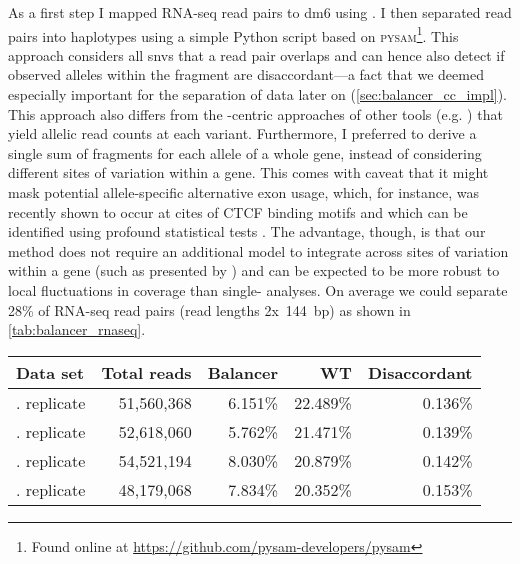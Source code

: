 As a first step I mapped RNA-seq read pairs to \ac{dm6} using \STAR. I then
separated read pairs into haplotypes using a simple Python script based on
\textsc{pysam}\footnote{Found online at \url{https://github.com/pysam-developers/pysam}}.
This approach considers all \acp{snv} that a read pair overlaps and can hence
also detect if observed alleles within the fragment are disaccordant---a fact
that we deemed especially important for the separation of \hic
data later on (\cref{sec:balancer_cc_impl}). This approach also differs
from the \snv-centric approaches of other tools (e.g. \cite{Castel2015}) that
yield allelic read counts at each variant. Furthermore, I preferred to derive a
single sum of fragments for each allele of a whole gene, instead of considering
different sites of variation within a gene. This comes with caveat that
it might mask potential allele-specific alternative exon usage, which, for instance, was
recently shown to occur at cites of CTCF binding motifs
\citep{Ruiz-Velasco2017} and which can be identified using profound
statistical tests \citep[for instance]{Skelly2011}. The advantage, though, is
that our method does not require an additional model to integrate across sites of
variation within a gene (such as presented by \cite{Mayba2014}) and can be
expected to be more robust to local fluctuations in coverage than single-\snv
analyses. On average we could separate 28\% of RNA-seq read pairs (read lengths
2x~144~bp) as shown in \cref{tab:balancer_rnaseq}.

\begin{table}[ht]
    \centering
    \begin{tabu}{lrrrr}
        \toprule
        Data set   & Total reads   & Balancer   & WT   & Disaccordant \\
        \midrule
        . replicate & 51,560,368  & 6.151\% & 22.489\%  & 0.136\% \\
        . replicate & 52,618,060  & 5.762\% & 21.471\%  & 0.139\% \\
        . replicate & 54,521,194  & 8.030\% & 20.879\%  & 0.142\% \\
        . replicate & 48,179,068  & 7.834\% & 20.352\%  & 0.153\% \\
        \bottomrule
    \end{tabu}
\end{table}

